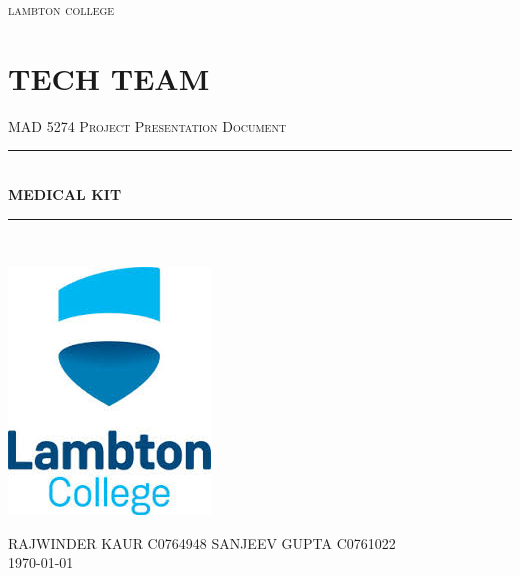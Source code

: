 \documentclass[12pt]{article}
\begin{document}
\begin{titlepage}

\newcommand{\HRule}{\rule{\linewidth}{0.5mm}} %

\center %
 

\textsc{\LARGE lambton college}\\[1.5cm] 
\section * {TECH TEAM}
\textsc{\Large MAD 5274 Project Presentation Document}\\[0.8cm]



\HRule \\[0.4cm]
{ \huge \bfseries MEDICAL KIT}\\[0.4cm] %
\HRule \\[1.5cm]
 

\begin{center}
\includegraphics[scale=0.65]{LOGO.jpeg}\\[0.75cm]
\end{center}


\textsc{\Large RAJWINDER KAUR C0764948
\hspace{2.75cm}
SANJEEV GUPTA C0761022}\\[0.75cm]



{\large \today}\\[2.5cm] %

\vfill %

\end{titlepage}
\end{document}
